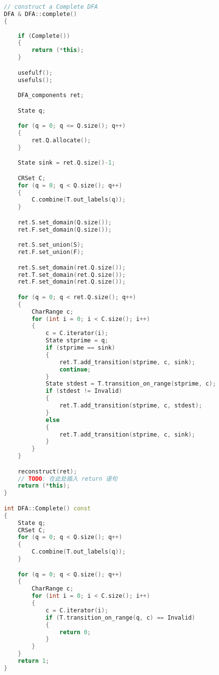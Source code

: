 \begin{lstlisting}[language=C++,label={lst:complete-imp},caption={文件 DFA.cpp}]
// construct a Complete DFA
DFA & DFA::complete()
{
    
    if (Complete())
    {
        return (*this);
    }

    usefulf();
    usefuls();

    DFA_components ret;

    State q;

    for (q = 0; q <= Q.size(); q++)
    {
        ret.Q.allocate();
    }

    State sink = ret.Q.size()-1;

    CRSet C;
    for (q = 0; q < Q.size(); q++)
    {
        C.combine(T.out_labels(q));
    }

    ret.S.set_domain(Q.size());
    ret.F.set_domain(Q.size());

    ret.S.set_union(S);
    ret.F.set_union(F);

    ret.S.set_domain(ret.Q.size());
    ret.T.set_domain(ret.Q.size());
    ret.F.set_domain(ret.Q.size());

    for (q = 0; q < ret.Q.size(); q++)
    {
        CharRange c;
        for (int i = 0; i < C.size(); i++)
        {
            c = C.iterator(i);
            State stprime = q;
            if (stprime == sink)
            {
                ret.T.add_transition(stprime, c, sink);
                continue;
            }
            State stdest = T.transition_on_range(stprime, c);
            if (stdest != Invalid)
            {
                ret.T.add_transition(stprime, c, stdest);
            }
            else
            {
                ret.T.add_transition(stprime, c, sink);
            }
        }
    }

    reconstruct(ret);
    // TODO: 在此处插入 return 语句
    return (*this);
}

int DFA::Complete() const
{
    State q;
    CRSet C;
    for (q = 0; q < Q.size(); q++)
    {
        C.combine(T.out_labels(q));
    }

    for (q = 0; q < Q.size(); q++)
    {
        CharRange c;
        for (int i = 0; i < C.size(); i++)
        {
            c = C.iterator(i);
            if (T.transition_on_range(q, c) == Invalid)
            {
                return 0;
            }
        }
    }
    return 1;
}
\end{lstlisting}
